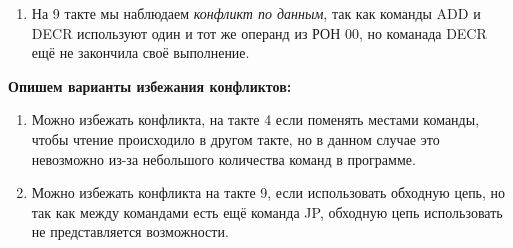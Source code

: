 \documentclass[a4paper,14pt]{extarticle}
\begin{document}
\begin{problem*}
\begin{enumerate}
	\item На 9 такте мы наблюдаем\textit{ конфликт по данным}, так как команды ADD и DECR используют один и тот же операнд из РОН 00, но команада DECR ещё не закончила своё выполнение.

	
\end{enumerate}

\textbf{Опишем варианты избежания конфликтов:}
\begin{enumerate}
	\item Можно избежать конфликта, на такте 4 если поменять местами команды, чтобы чтение происходило в другом такте, но в данном случае это невозможно из-за небольшого количества команд в программе.
	
	\item Можно избежать конфликта на такте 9, если использовать обходную цепь, но так как между командами есть ещё команда JP, обходную цепь использовать не представляется возможности.
\end{enumerate}


\end{problem*}
\end{document}
